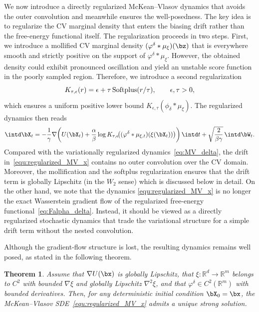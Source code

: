 \documentclass[a4paper,fleqn]{cas-sc}
\newtheorem{theorem}{Theorem}[section]
\theoremstyle{definition}
\begin{document}
We now introduce a directly regularized McKean--Vlasov dynamics that avoids the outer convolution and meanwhile ensures the well-posedness. 
The key idea is to regularize the CV marginal density that enters the biasing drift rather than the free-energy functional itself. The regularization proceeds in two steps. First, we introduce a mollified CV marginal density $(\varphi^\delta * \mu_\xi)(\bz)$ that is everywhere smooth and strictly positive on the support of $\varphi^\delta * \mu_\xi$. However, the obtained density could exhibit pronounced oscillation and yield an unstable score function in the poorly sampled region. Therefore, we introduce a second regularization
\[
K_{\tau,\epsilon}(r)
=
\epsilon+\tau\,{\rm Softplus}(r/\tau),
\qquad
\epsilon,\tau>0,
\]
which ensures a uniform positive lower bound $K_{\epsilon,\tau}(\phi_\delta * \mu_\xi)$.  The regularized dynamics then reads
\begin{equation}\label{equ:regularized_MV_x}
    \intd \bX_t = -\frac{1}{\gamma}\nabla\!\left(U(\bX_t) + \frac{\alpha}{\beta}\log K_{\tau,\epsilon}\!\bigl((\varphi^\delta * \mu_{\xi,t})(\xi(\bX_t))\bigr)\right) \intd t + \sqrt{\frac{2}{\beta\gamma}}\,\intd \bW_t.
\end{equation}
Compared with the variationally regularized dynamics~\eqref{eq:MV_delta}, the drift in~\eqref{equ:regularized_MV_x} contains no outer convolution over the CV domain. Moreover, the mollification and the softplus regularization ensures that the drift term is globally Lipschitz (in the $W_2$ sense) which is discussed below in detail. 
%
On the other hand, we note that the dynamics \eqref{equ:regularized_MV_x} is no longer the exact Wasserstein gradient flow of the regularized free-energy functional~\eqref{eq:Falpha_delta}. 
Instead, it should be viewed as a directly regularized stochastic dynamics that trade the variational structure for a simple drift term without the nested convolution.  





Although the gradient-flow structure is lost, the resulting dynamics remains well posed, as stated in the following theorem.


\begin{theorem}\label{thm:mk_well}
Assume that $\nabla U(\bx)$ is globally Lipschitz, that $\xi:\mathbb R^{d}\to\mathbb R^m$ belongs to $C^2$ with bounded $\nabla \xi$ and globally Lipschitz $\nabla^2 \xi$, and that $\varphi^\delta\in C^2(\mathbb R^m)$ with bounded derivatives. 
Then, for any deterministic initial condition \(\bX_0=\bx\), the McKean--Vlasov SDE~\eqref{equ:regularized_MV_x} admits a unique strong solution.
\end{theorem}
\end{document}
